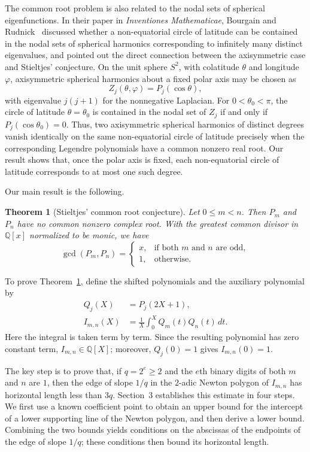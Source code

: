 \documentclass[11pt,a4paper]{article}
\numberwithin{equation}{section}
\newtheorem{theorem}{Theorem}[section]
\theoremstyle{definition}
\begin{document}
The common root problem is also related to the nodal sets of spherical eigenfunctions. In their paper in \emph{Inventiones Mathematicae}, Bourgain and Rudnick~\cite[Section~1.4]{BourgainRudnick} discussed whether a non-equatorial circle of latitude can be contained in the nodal sets of spherical harmonics corresponding to infinitely many distinct eigenvalues, and pointed out the direct connection between the axisymmetric case and Stieltjes' conjecture. On the unit sphere $S^2$, with colatitude $\theta$ and longitude $\varphi$, axisymmetric spherical harmonics about a fixed polar axis may be chosen as
\begin{equation}\label{eq:1-2}
 Z_j(\theta,\varphi)=P_j(\cos\theta), 
\end{equation}
with eigenvalue $j(j+1)$ for the nonnegative Laplacian. For $0<\theta_0<\pi$, the circle of latitude $\theta=\theta_0$ is contained in the nodal set of $Z_j$ if and only if $P_j(\cos\theta_0)=0$. Thus, two axisymmetric spherical harmonics of distinct degrees vanish identically on the same non-equatorial circle of latitude precisely when the corresponding Legendre polynomials have a common nonzero real root. Our result shows that, once the polar axis is fixed, each non-equatorial circle of latitude corresponds to at most one such degree.

Our main result is the following.

\begin{theorem}[Stieltjes' common root conjecture]\label{thm:1-1}
Let $0\le m<n$. Then $P_m$ and $P_n$ have no common nonzero complex root. With the greatest common divisor in $\mathbb{Q}[x]$ normalized to be monic, we have
\[
 \gcd(P_m,P_n)=
 \begin{cases}
 x,&\text{if both $m$ and $n$ are odd},\\
 1,&\text{otherwise}.
 \end{cases}
\]
\end{theorem}

To prove Theorem~\ref{thm:1-1}, define the shifted polynomials and the auxiliary polynomial by
\begin{align}
 Q_j(X)&=P_j(2X+1),\label{eq:1-3}\\
 I_{m,n}(X)&=\frac1X\int_0^X Q_m(t)Q_n(t)\,dt.\label{eq:1-4}
\end{align}
Here the integral is taken term by term. Since the resulting polynomial has zero constant term, $I_{m,n}\in\mathbb{Q}[X]$; moreover, $Q_j(0)=1$ gives $I_{m,n}(0)=1$.

The key step is to prove that, if $q=2^e\ge2$ and the $e$th binary digits of both $m$ and $n$ are $1$, then the edge of slope $1/q$ in the $2$-adic Newton polygon of $I_{m,n}$ has horizontal length less than $3q$. Section~3 establishes this estimate in four steps. We first use a known coefficient point to obtain an upper bound for the intercept of a lower supporting line of the Newton polygon, and then derive a lower bound. Combining the two bounds yields conditions on the abscissas of the endpoints of the edge of slope $1/q$; these conditions then bound its horizontal length.
\end{document}

